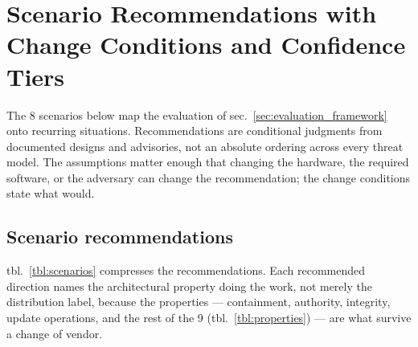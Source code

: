 \documentclass[
  english,
  9pt,
]{extarticle}
\begin{document}
\newpage

\section{Scenario Recommendations with Change Conditions and Confidence
Tiers}\label{sec:scenarios}

The 8 scenarios below map the evaluation of
sec.~\ref{sec:evaluation_framework} onto recurring situations.
Recommendations are conditional judgments from documented designs and
advisories, not an absolute ordering across every threat model. The
assumptions matter enough that changing the hardware, the required
software, or the adversary can change the recommendation; the change
conditions state what would.

\subsection{Scenario recommendations}\label{scenario-recommendations}

tbl.~\ref{tbl:scenarios} compresses the recommendations. Each
recommended direction names the architectural property doing the work,
not merely the distribution label, because the properties ---
containment, authority, integrity, update operations, and the rest of
the 9 (tbl.~\ref{tbl:properties}) --- are what survive a change of
vendor.
\end{document}
